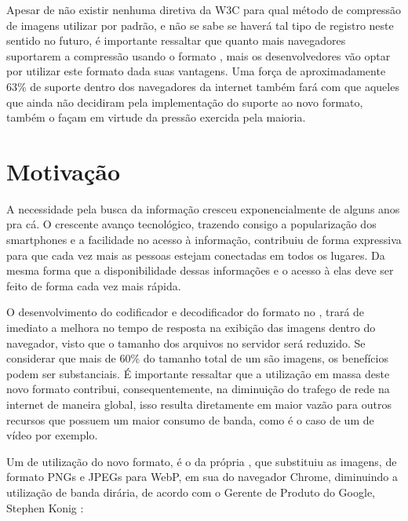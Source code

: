 \documentclass[espaco=simples,appendix=Name]{abnt}
\begin{document}
Apesar de não existir nenhuma diretiva da W3C para qual método de compressão de imagens utilizar por padrão, e não se sabe se haverá tal tipo de registro neste sentido no futuro, é importante ressaltar que quanto mais navegadores suportarem a compressão usando o formato , mais os desenvolvedores vão optar por utilizar este formato dada suas vantagens. Uma força de aproximadamente 63\% de suporte dentro dos navegadores da internet também fará com que aqueles que ainda não decidiram pela implementação do suporte ao novo formato, também o façam em virtude da pressão exercida pela maioria.

\section{Motivação}

A necessidade pela busca da informação cresceu exponencialmente de alguns anos pra cá. O crescente avanço tecnológico, trazendo consigo a popularização dos smartphones e a facilidade no acesso à informação, contribuiu de forma expressiva para que cada vez mais as pessoas estejam conectadas em todos os lugares. Da mesma forma que a disponibilidade dessas informações e o acesso à elas deve ser feito de forma cada vez mais rápida.

O desenvolvimento do codificador e decodificador do formato  no , trará de imediato a melhora no tempo de resposta na exibição das imagens dentro do navegador, visto que o tamanho dos arquivos no servidor será reduzido. Se considerar que mais de 60\% do tamanho total de um  são imagens, os benefícios podem ser substanciais. É importante ressaltar que a utilização em massa deste novo formato contribui, consequentemente, na diminuição do trafego de rede na internet de maneira global, isso resulta diretamente em maior vazão para outros recursos que possuem um maior consumo de banda, como é o caso de um  de vídeo por exemplo.

Um  de utilização do novo formato, é o da própria , que substituiu as imagens, de formato PNGs e JPEGs para WebP, em sua  do navegador Chrome, diminuindo a utilização de banda dirária, de acordo com o Gerente de Produto do Google, Stephen Konig \cite{ChromiumBlog}:
\begin{citacao}
\end{citacao}
\end{document}
